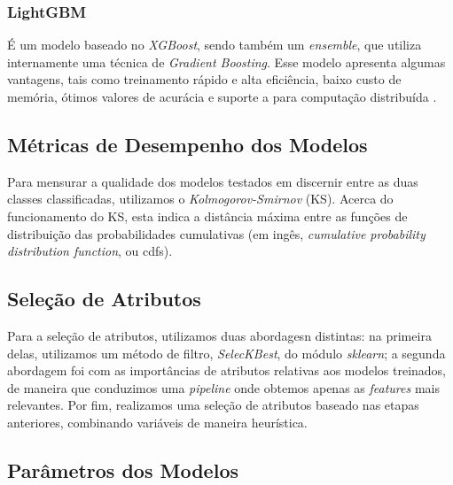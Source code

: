 \subsubsection{\textbf{LightGBM}}

É um modelo baseado no \textit{XGBoost}, sendo também um \textit{ensemble}, que utiliza internamente uma técnica de \textit{Gradient Boosting}. Esse modelo apresenta algumas vantagens, tais como treinamento rápido e alta eficiência, baixo custo de memória, ótimos valores de acurácia e suporte a para computação distribuída \cite{b4}.

\subsection{Métricas de Desempenho dos Modelos}

Para mensurar a qualidade dos modelos testados em discernir entre as duas classes classificadas, utilizamos o \textit{Kolmogorov-Smirnov} (KS). Acerca do funcionamento do KS, esta indica a distância máxima entre as funções de distribuição das probabilidades cumulativas (em ingês, \textit{cumulative probability distribution function}, ou cdfs).

\subsection{Seleção de Atributos}

Para a seleção de atributos, utilizamos duas abordagesn distintas: na primeira delas, utilizamos um método de filtro, \textit{SelecKBest}, do módulo \textit{sklearn}; a segunda abordagem foi com as importâncias de atributos relativas aos modelos treinados, de maneira que conduzimos uma \textit{pipeline} onde obtemos apenas as \textit{features} mais relevantes. Por fim, realizamos uma seleção de atributos baseado nas etapas anteriores, combinando variáveis de maneira heurística.

\subsection{Parâmetros dos Modelos}


